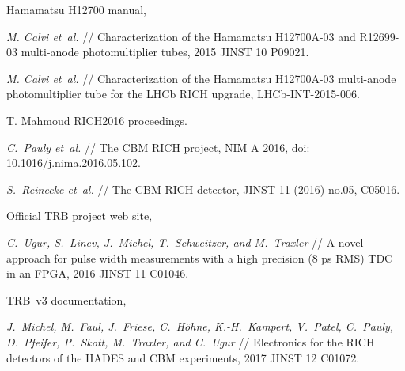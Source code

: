 \begin{thebibliography}{99}

Hamamatsu H12700 manual,

\textit{M. Calvi et~al.} //
Characterization of the Hamamatsu H12700A-03 and R12699-03 multi-anode photomultiplier tubes,
2015 JINST 10 P09021.

\textit{M. Calvi et~al.} //
Characterization of the Hamamatsu H12700A-03 multi-anode photomultiplier tube for the LHCb RICH upgrade,
LHCb-INT-2015-006.



T. Mahmoud RICH2016 proceedings.

\textit{C.~Pauly et~al.} //
The CBM RICH project,
NIM A 2016,
doi: 10.1016/j.nima.2016.05.102.

\textit{S.~Reinecke et~al.} //
The CBM-RICH detector,
JINST 11 (2016) no.05, C05016.

Official TRB project web site,

\textit{C.~Ugur, S.~Linev, J.~Michel, T.~Schweitzer, and M.~Traxler} //
A novel approach for pulse width measurements with a high precision (8 ps RMS) TDC in an FPGA,
2016 JINST 11 C01046.


TRB~v3 documentation,

\textit{J.~Michel, M.~Faul, J.~Friese, C.~H\"{o}hne, K.-H.~Kampert, V.~Patel, C.~Pauly, D.~Pfeifer, P.~Skott, M.~Traxler, and C.~Ugur} //
Electronics for the RICH detectors of the HADES and CBM experiments,
2017 JINST 12 C01072.


\end{thebibliography}
